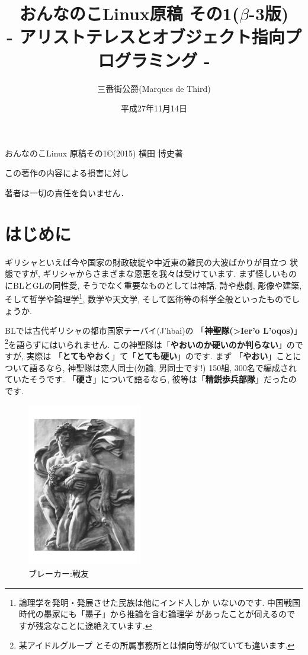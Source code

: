 \documentclass[b5j,8pt,twocolumn]{ltjsarticle}
\title{おんなのこLinux原稿 その1($\beta$-3版)\\
- アリストテレスとオブジェクト指向プログラミング -}
\author{三番街公爵(Marques de Third)}
\date{
平成27年11月14日
 }
\newcommand{\textgreek}[1]{\begingroup\fontencoding{LGR}\selectfont#1\endgroup}
\newcommand{\textgreek}[1]{\begingroup\fontencoding{LGR}\selectfont#1\endgroup}
\begin{document}
\maketitle

\vspace{10cm}

おんなのこLinux 原稿その1\copyright (2015) 横田 博史著\par

この著作の内容による損害に対し

著者は一切の責任を負いません．
\clearpage
\newpage
\setcounter{page}{1}

\section{はじめに}

ギリシャといえば今や国家の財政破綻や中近東の難民の大波ばかりが目立つ
状態ですが, ギリシャからさまざまな恩恵を我々は受けています. まず怪しいもの
にBLとGLの同性愛, そうでなく重要なものとしては神話, 詩や悲劇, 彫像や建築,
 そして哲学や論理学\footnote{論理学を発明・発展させた民族は他にインド人しか
いないのです. 中国戦国時代の墨家にも「墨子」\cite{墨子}から推論を含む論理学
があったことが伺えるのですが残念なことに途絶えています.}, 数学や天文学,
 そして医術等の科学全般といったものでしょうか.
\newline

BLでは古代ギリシャの都市国家テーバイ(\textgreek{J'hbai})の
「\textbf{神聖隊(\textgreek{>Ier'o L'oqos})}」\footnote{某アイドルグループ
とその所属事務所とは傾向等が似ていても違います.}を語らずにはいられません.
 この神聖隊は「\textbf{やおいのか硬いのか判らない}」のですが, 実際は
「\textbf{とてもやおく}」て「\textbf{とても硬い}」のです. まず
「\textbf{やおい}」ことについて語るなら, 神聖隊は恋人同士(勿論, 男同士です!)
150組, 300名で編成されていたそうです. 「\textbf{硬さ}」について語るなら,
 彼等は「\textbf{精鋭歩兵部隊}」だったのです.
\newline
 
 
\begin{figure}
\includegraphics[width=5cm]{arno_breker_kameradschaft.pdf}
\caption{ブレーカー:戦友}
\label{fig:breker2}
\end{figure}
\end{document}
